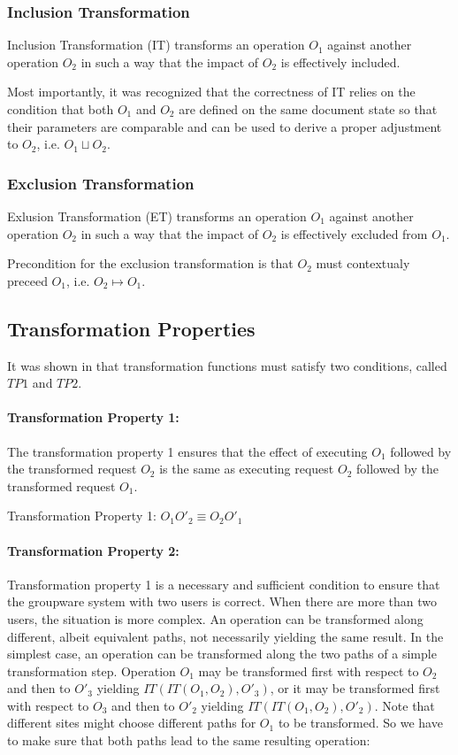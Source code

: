 \documentclass[11pt,a4paper]{article}
\begin{document}
\subsubsection{Inclusion Transformation}
Inclusion Transformation (IT) transforms an operation $O_{1}$ against another operation $O_{2}$ in such a way that the impact of $O_{2}$ is effectively included. 

Most importantly, it was recognized that the correctness of IT relies on the condition that both $O_{1}$ and $O_{2}$ are defined on the same document state so that their parameters are comparable and can be used to derive a proper adjustment to $O_{2}$, i.e. $O_{1} \sqcup O_{2}$.

\subsubsection{Exclusion Transformation}
Exlusion Transformation (ET) transforms an operation $O_{1}$ against another operation $O_{2}$ in such a way that the impact of $O_{2}$ is effectively excluded from $O_{1}$.

Precondition for the exclusion transformation is that $O_{2}$ must contextualy preceed $O_{1}$, i.e. $O_{2} \mapsto O_{1}$.


\subsection{Transformation Properties}
It was shown in \cite{ressel96} that transformation functions must satisfy two conditions, called $TP1$ and $TP2$.

\paragraph{Transformation Property 1:}
The transformation property 1 ensures that the effect of executing $O_{1}$ followed by the transformed request $O_{2}$ is the same as executing request $O_{2}$ followed by the transformed request $O_{1}$. 

\begin{defn}
Transformation Property 1:
$ O_{1} O'_{2} \equiv O_{2} O'_{1} $
\end{defn}

\paragraph{Transformation Property 2:}
Transformation property 1 is a necessary and sufficient condition to ensure that the groupware system with two users is correct. When there are more than two users, the situation is more complex. An operation can be transformed along different, albeit equivalent paths, not necessarily yielding the same result. In the simplest case, an operation can be transformed along the two paths of a simple transformation step. Operation $O_{1}$ may be transformed first with respect to $O_{2}$ and then to $O'_{3}$ yielding $IT(IT(O_{1},O_{2}),O'_{3})$, or it may be transformed first with respect to $O_{3}$ and then to $O'_{2}$ yielding $IT(IT(O_{1},O_{2}),O'_{2})$. Note that different sites might choose different paths for $O_{1}$ to be transformed. So we have to make sure that both paths lead to the same resulting operation:
\end{document}
